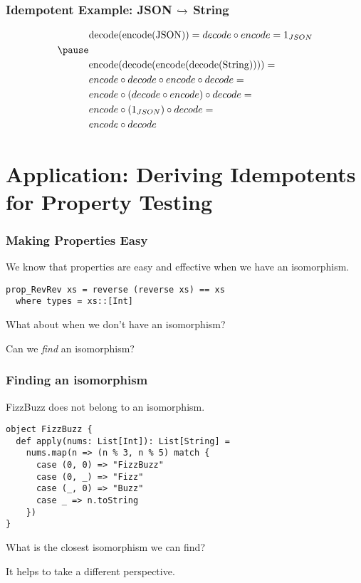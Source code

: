 \documentclass{beamer}
\begin{document}
\begin{frame}[fragile]
\frametitle{Idempotent Example: JSON {$\xhookrightarrow{}$} String}
\medskip
\begin{equation*}
\begin{aligned}
& \text{decode(encode(JSON))} = decode \circ encode = 1_{JSON} \\ \pause
& \\
& \text{encode(decode(encode(decode(String))))} = \\
& encode \circ decode \circ encode \circ decode = \\
& encode \circ (decode \circ encode) \circ decode = \\
& encode \circ (1_{JSON}) \circ decode = \\
& encode \circ decode \\
\end{aligned}
\end{equation*}
\end{frame}

\section{Application: Deriving Idempotents for Property Testing}

\begin{frame}[fragile]
\frametitle{Making Properties Easy}

We know that properties are easy and effective when we have 
an isomorphism. \\
\medskip

\begin{verbatim}
prop_RevRev xs = reverse (reverse xs) == xs
  where types = xs::[Int]
\end{verbatim}

\pause
\medskip
What about when we don't have an isomorphism? \\
\pause
\medskip

Can we \emph{find} an isomorphism?

\end{frame}

\begin{frame}[fragile]
\frametitle{Finding an isomorphism}

FizzBuzz does not belong to an isomorphism.
\medskip

\begin{verbatim}
object FizzBuzz {
  def apply(nums: List[Int]): List[String] =
    nums.map(n => (n % 3, n % 5) match {
      case (0, 0) => "FizzBuzz"
      case (0, _) => "Fizz"
      case (_, 0) => "Buzz"
      case _ => n.toString
    })
}
\end{verbatim}

\pause
\medskip
What is the closest isomorphism we can find? \\
\medskip

It helps to take a different perspective.

\end{frame}
\end{document}
